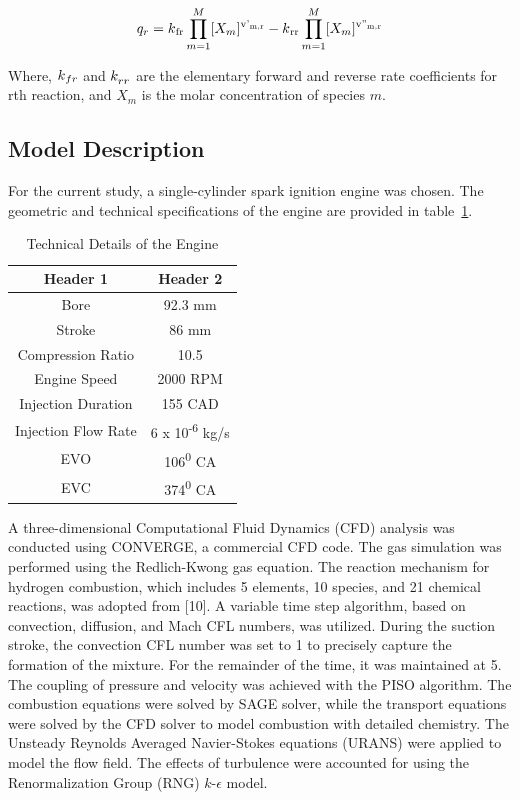 \documentclass[conference]{IEEEtran}
\begin{document}
\begin{gather*}
    q_r = k\textsubscript{fr} \prod_{m=1}^{M} [X_m]\textsuperscript{v'\textsubscript{m,r}} - k\textsubscript{rr} \prod_{m=1}^{M} [X_m]\textsuperscript{v''\textsubscript{m,r}}
\end{gather*}

Where, $k\textsubscript{$fr$}$ and $k_\textsubscript{$rr$}$ are the elementary forward and reverse rate coefficients for rth reaction, and $X_m$ is the molar concentration of species $m$.

\subsection{Model Description}
For the current study, a single-cylinder spark ignition engine was chosen. 
The geometric and technical specifications of the engine are provided in table~\ref{table_1}.

\begin{table}[!ht]
    \centering
    \caption{Technical Details of the Engine}
    \label{table_1}
    \begin{tabular}{|c|c|}
    \hline
    Header 1 & Header 2 \\
    \hline
    Bore & 92.3 mm \\
    Stroke & 86 mm \\
    Compression Ratio & 10.5 \\
    Engine Speed & 2000 RPM \\
    Injection Duration & 155 CAD \\
    Injection Flow Rate & 6 x 10\textsuperscript{-6} kg/s \\
    EVO & 106\textsuperscript{0} CA \\
    EVC & 374\textsuperscript{0} CA \\
    \hline
    \end{tabular}
    \end{table}

A three-dimensional Computational Fluid Dynamics (CFD) analysis was conducted using CONVERGE, a commercial CFD code. 
The gas simulation was performed using the Redlich-Kwong gas equation. 
The reaction mechanism for hydrogen combustion, which includes 5 elements, 10 species, and 21 chemical reactions, was adopted from [10]. 
A variable time step algorithm, based on convection, diffusion, and Mach CFL numbers, was utilized. 
During the suction stroke, the convection CFL number was set to 1 to precisely capture the formation of the mixture. 
For the remainder of the time, it was maintained at 5. 
The coupling of pressure and velocity was achieved with the PISO algorithm. 
The combustion equations were solved by SAGE solver, while the transport equations were solved by the CFD solver to model combustion with detailed chemistry. 
The Unsteady Reynolds Averaged Navier-Stokes equations (URANS) were applied to model the flow field. 
The effects of turbulence were accounted for using the Renormalization Group (RNG) $k$-$\epsilon$ model.\\
\end{document}
